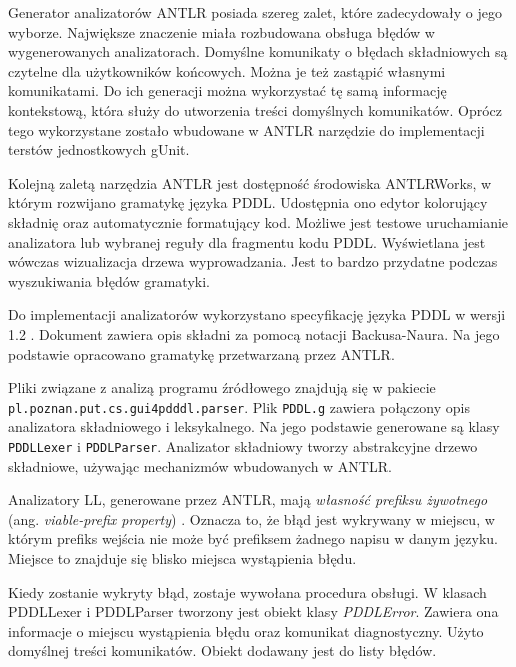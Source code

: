 Generator analizatorów ANTLR posiada szereg zalet, które zadecydowały o jego wyborze.
Największe znaczenie miała rozbudowana obsługa błędów w wygenerowanych analizatorach.
Domyślne komunikaty o błędach składniowych są czytelne dla użytkowników końcowych.
Można je też zastąpić własnymi komunikatami. Do ich generacji można wykorzystać tę samą 
informację kontekstową, która służy do utworzenia treści domyślnych komunikatów.
Oprócz tego wykorzystane zostało wbudowane w ANTLR narzędzie do implementacji
terstów jednostkowych gUnit.

Kolejną zaletą narzędzia ANTLR jest dostępność środowiska ANTLRWorks, w którym
rozwijano gramatykę języka PDDL. Udostępnia 
ono edytor kolorujący składnię oraz automatycznie formatujący kod. Możliwe jest
testowe uruchamianie analizatora lub wybranej reguły dla fragmentu kodu PDDL.
Wyświetlana jest wówczas wizualizacja drzewa wyprowadzania. Jest to bardzo przydatne
podczas wyszukiwania błędów gramatyki.

Do implementacji analizatorów wykorzystano specyfikację języka PDDL w wersji 1.2 \cite{pddl}.
Dokument zawiera opis składni za pomocą notacji Backusa-Naura. Na jego podstawie opracowano
gramatykę przetwarzaną przez ANTLR.

\begin{sloppypar}
Pliki związane z analizą programu źródłowego znajdują się w pakiecie 
\texttt{pl.poznan.put.cs.gui4pdddl.parser}.
Plik \texttt{PDDL.g} zawiera połączony opis analizatora
składniowego i leksykalnego.  %
Na jego podstawie generowane są klasy \texttt{PDDLLexer} i \texttt{PDDLParser}.
Analizator składniowy tworzy abstrakcyjne drzewo składniowe, używając mechanizmów
wbudowanych w ANTLR.
\end{sloppypar}


Analizatory LL, generowane przez ANTLR, mają \emph{własność prefiksu żywotnego} (ang. \emph{viable-prefix property}) \cite{compilers,compilersEN}. %
Oznacza to, że błąd jest wykrywany w miejscu, w którym prefiks wejścia nie może
być prefiksem żadnego napisu w danym języku. Miejsce to znajduje się blisko miejsca
wystąpienia błędu.

Kiedy zostanie wykryty błąd, zostaje wywołana procedura obsługi. W klasach 
PDDLLexer i PDDLParser tworzony jest obiekt klasy \emph{PDDLError}. Zawiera
ona informacje o miejscu wystąpienia błędu oraz komunikat diagnostyczny. Użyto
domyślnej treści komunikatów. Obiekt dodawany jest do listy błędów. 

